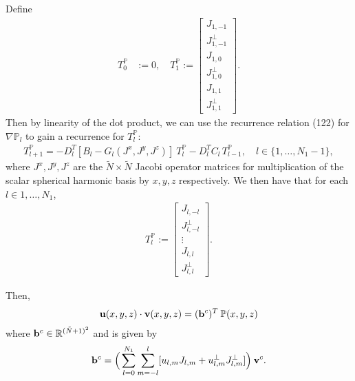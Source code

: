 \documentclass[11pt, oneside]{article}   	%
\newcommand{\R}{\mathbb{R}}
\newcommand{\bigP}{\mathbb{P}}
\newcommand{\gradPl}{\nabla\mathbb{P}_l}
\newcommand{\Dlt}{D^T_l}
\begin{document}
Define
\begin{align}
T^\bigP_0 &:= 0, \quad
T^\bigP_1 := \begin{bmatrix}
			J_{1,-1} \\
			J^\perp_{1,-1} \\
			J_{1,0} \\
			J^\perp_{1,0} \\
			J_{1,1} \\
			J^\perp_{1,1}
	  	\end{bmatrix}.
\end{align}
Then by linearity of the dot product, we can use the recurrence relation (122) for \(\gradPl\) to gain a recurrence for \(T^\bigP_l\):
\begin{align}
T^\bigP_{l+1} = -\Dlt [B_l-G_l(J^x, J^y, J^z)] \: T^\bigP_l - \Dlt C_l  \, T^\bigP_{l-1}, \quad l \in \{1,\dots,N_1-1\},
\end{align}
where \(J^x, J^y, J^z\) are the \(\tilde{N} \times \tilde{N}\) Jacobi operator matrices for multiplication of the scalar spherical harmonic basis by \(x, y, z\) respectively. We then have that for each \(l \in {1,\dots,N_1}\),
\begin{align}
T^\bigP_l := \begin{bmatrix}
			J_{l,-l} \\
			J^\perp_{l,-l} \\
			\vdots \\
			J_{l,l} \\
			J^\perp_{l,l}
	  	\end{bmatrix}.
\end{align}

Then, 
\begin{align}
\bold{u}(x,y,z) \cdot \bold{v}(x,y,z) = (\bold{b}^c)^T  \: \bigP(x,y,z)
\end{align}
where \(\bold{b}^c \in \R^{(\tilde{N}+1)^2}\) and is given by
\begin{align}
\bold{b}^c = \Big(\sum_{l=0}^{N_1} \sum_{m=-l}^{l} [ u_{l,m} J_{l,m} + u^{\perp}_{l,m} J^\perp_{l,m} ] \Big) \: \bold{v}^c.
\end{align}


% 
\end{document}
